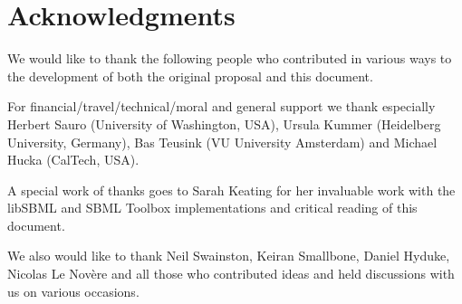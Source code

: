 
\section{Acknowledgments}

We would like to thank the following people who contributed in various ways to the development of both the original proposal and this document.

For financial/travel/technical/moral and general support we thank especially Herbert Sauro (University of Washington, USA), Ursula Kummer (Heidelberg University, Germany), Bas Teusink (VU University Amsterdam) and Michael Hucka (CalTech, USA).

A special work of thanks goes to Sarah Keating for her invaluable work with  the \textsf{libSBML} and \textsf{SBML Toolbox} implementations and critical reading of this document.

We also would like to thank Neil Swainston, Keiran Smallbone, Daniel Hyduke, Nicolas Le Nov\`{e}re and all those who contributed ideas and held discussions with us on various occasions.

